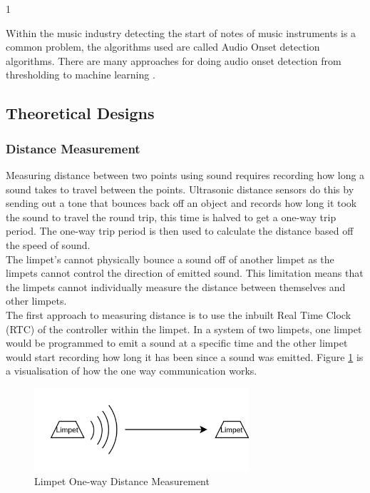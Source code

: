 1\documentclass{article}
\begin{document}
Within the music industry detecting the start of notes of music instruments is a common problem, the algorithms used are called Audio Onset detection algorithms. There are many approaches for doing audio onset detection from thresholding to machine learning \cite{bock2012evaluating}.\\

\subsection{Theoretical Designs}
\subsubsection{Distance Measurement}
Measuring distance between two points using sound requires recording how long a sound takes to travel between the points. Ultrasonic distance sensors do this by sending out a tone that bounces back off an object and records how long it took the sound to travel the round trip, this time is halved to get a one-way trip period. The one-way trip period is then used to calculate the distance based off the speed of sound.\\

The limpet's cannot physically bounce a sound off of another limpet as the limpets cannot control the direction of emitted sound. This limitation means that the limpets cannot individually measure the distance between themselves and other limpets.\\

The first approach to measuring distance is to use the inbuilt Real Time Clock (RTC) of the controller within the limpet. In a system of two limpets, one limpet would be programmed to emit a sound at a specific time and the other limpet would start recording how long it has been since a sound was emitted. Figure \ref{fig:limpetOneway} is a visualisation of how the one way communication works.\\

\begin{figure}[H]
	\centering
	\noindent\includegraphics[width=0.71\textwidth]{images/limpetOneway}
	\caption{Limpet One-way Distance Measurement}
	\label{fig:limpetOneway}
\end{figure}
\end{document}
